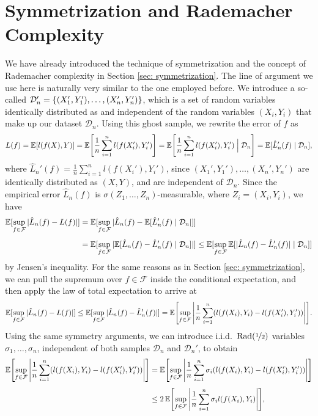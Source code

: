 \section{Symmetrization and Rademacher Complexity}

We have already introduced the technique of symmetrization and the concept of Rademacher complexity in Section \ref{sec: symmetrization}. The line of argument we use here is naturally very similar to the one employed before. We introduce a so-called  $\mathcal{D}_n' = \set{(X_1', Y_1'), \dots, (X_n', Y_n')}$, which is a set of random variables identically distributed as and independent of the random variables $(X_i, Y_i)$ that make up our dataset $\mathcal{D}_n$. Using this ghost sample, we rewrite the error of $f$ as
\[
    L(f) = \Exp[l(f(X), Y)] = \Exp\left[\frac{1}{n} \sum_{i=1}^n l(f(X_i'), Y_i')\right] = \Exp\left[\frac{1}{n} \sum_{i=1}^n l(f(X_i'), Y_i') \given[\Big] \mathcal{D}_n\right] = \Exp[\hat{L}_n'(f) \given \mathcal{D}_n],
\]
where $\hat{L}_n'(f) = \frac{1}{n} \sum_{i=1}^n l(f(X_i'), Y_i')$, since $(X_1', Y_1'), \dots, (X_n', Y_n')$ are identically distributed as $(X, Y)$, and are independent of $\mathcal{D}_n$. Since the empirical error $\hat{L}_n(f)$ is $\sigma(Z_1, \dots, Z_n)$-measurable, where $Z_i = (X_i, Y_i)$, we have
\begin{align*}
    \Exp[\sup_{f \in \mathcal{F}} \abs*{\hat L_n(f) - L(f)}] &= \Exp[\sup_{f \in \mathcal{F}} \abs*{\hat{L}_n(f) - \Exp[\hat{L}_n'(f) \given \mathcal{D}_n}]] \\[4pt]
    &= \Exp[\sup_{f \in \mathcal{F}} \abs*{\Exp[\hat{L}_n(f) - \hat{L}_n'(f) \given \mathcal{D}_n]}] \leq \Exp[\sup_{f \in \mathcal{F}} \Exp[\abs*{\hat{L}_n(f) -\hat{L}_n'(f)} \given \mathcal{D}_n]]
\end{align*}
by Jensen's inequality. For the same reasons as in Section \ref{sec: symmetrization}, we can pull the supremum over $f \in \mathcal{F}$ inside the conditional expectation, and then apply the law of total expectation to arrive at
\[
    \Exp[\sup_{f \in \mathcal{F}} \abs*{\hat{L}_n(f) - L(f)}] \leq \Exp[\sup_{f \in \mathcal{F}} \abs*{\hat{L}_n(f) -\hat{L}_n'(f)}] = \Exp\left[\sup_{f \in \mathcal{F}} \abs{\frac{1}{n} \sum_{i=1}^n (l(f(X_i), Y_i) - l(f(X_i'), Y_i'))}\right].
\]
Using the same symmetry arguments, we can introduce i.i.d.\ $\operatorname{Rad}(\nicefrac{1}{2})$ variables $\sigma_1, \dots, \sigma_n$, independent of both samples $\mathcal{D}_n$ and $\mathcal{D}_n'$, to obtain
\begin{align*}
    \Exp\left[\sup_{f \in \mathcal{F}} \abs{\frac{1}{n} \sum_{i=1}^n (l(f(X_i), Y_i) - l(f(X_i'), Y_i'))}\right] &= \Exp\left[\sup_{f \in \mathcal{F}} \abs{\frac{1}{n} \sum_{i=1}^n \sigma_i (l(f(X_i), Y_i) - l(f(X_i'), Y_i'))}\right] \\[4pt]
    &\leq 2 \Exp\left[\sup_{f \in \mathcal{F}} \abs{\frac{1}{n} \sum_{i=1}^n \sigma_i l(f(X_i), Y_i)}\right],
\end{align*}
